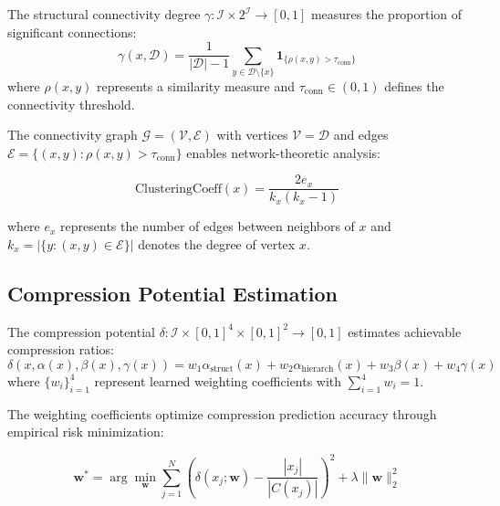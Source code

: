 \begin{definition}
The structural connectivity degree $\gamma: \mathcal{I} \times 2^{\mathcal{I}} \to [0,1]$ measures the proportion of significant connections:
\begin{equation}
\gamma(x, \mathcal{D}) = \frac{1}{|\mathcal{D}| - 1} \sum_{y \in \mathcal{D} \setminus \{x\}} \mathbf{1}_{\{\rho(x,y) > \tau_{\text{conn}}\}}
\label{eq:connectivity-degree}
\end{equation}
where $\rho(x,y)$ represents a similarity measure and $\tau_{\text{conn}} \in (0,1)$ defines the connectivity threshold.
\end{definition}

The connectivity graph $\mathcal{G} = (\mathcal{V}, \mathcal{E})$ with vertices $\mathcal{V} = \mathcal{D}$ and edges $\mathcal{E} = \{(x,y) : \rho(x,y) > \tau_{\text{conn}}\}$ enables network-theoretic analysis:

\begin{equation}
\text{ClusteringCoeff}(x) = \frac{2e_x}{k_x(k_x - 1)}
\label{eq:clustering-coefficient}
\end{equation}

where $e_x$ represents the number of edges between neighbors of $x$ and $k_x = |\{y : (x,y) \in \mathcal{E}\}|$ denotes the degree of vertex $x$.

\subsection{Compression Potential Estimation}

\begin{definition}
The compression potential $\delta: \mathcal{I} \times [0,1]^4 \times [0,1]^2 \to [0,1]$ estimates achievable compression ratios:
\begin{equation}
\delta(x, \alpha(x), \beta(x), \gamma(x)) = w_1 \alpha_{\text{struct}}(x) + w_2 \alpha_{\text{hierarch}}(x) + w_3 \beta(x) + w_4 \gamma(x)
\label{eq:compression-potential}
\end{equation}
where $\{w_i\}_{i=1}^4$ represent learned weighting coefficients with $\sum_{i=1}^4 w_i = 1$.
\end{definition}

The weighting coefficients optimize compression prediction accuracy through empirical risk minimization:

\begin{equation}
\mathbf{w}^* = \arg\min_{\mathbf{w}} \sum_{j=1}^N \left( \delta(x_j; \mathbf{w}) - \frac{|x_j|}{|C(x_j)|} \right)^2 + \lambda \|\mathbf{w}\|_2^2
\label{eq:weight-optimization}
\end{equation}

